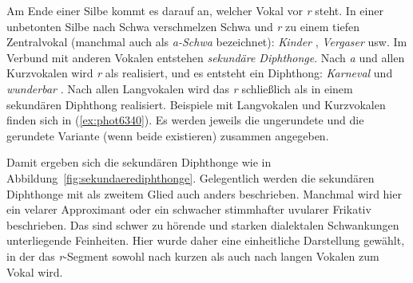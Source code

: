 Am Ende einer Silbe kommt es darauf an, welcher Vokal vor \textit{r} steht.
In einer unbetonten Silbe nach Schwa verschmelzen Schwa und \textit{r} zu einem tiefen Zentralvokal \textipa{[5]} (manchmal auch als \textit{a-Schwa} bezeichnet): \textit{Kinder} \textipa{[kInd5]}, \textit{Vergaser} \textipa{[f5ga:z5]} usw.
Im Verbund mit anderen Vokalen entstehen \textit{sekundäre Diphthonge}.
Nach \textit{a} und allen Kurzvokalen wird \textit{r} als \textipa{[@]} realisiert, und es entsteht ein Diphthong: \textit{Karneval} \textipa{[k\t{a@}n@val]} und \textit{wunderbar} \textipa{[vUnd5b\t{a@}]}.
Nach allen Langvokalen wird das \textit{r} schließlich als \textipa{[5]} in einem sekundären Diphthong realisiert.
Beispiele mit Langvokalen und Kurzvokalen finden sich in (\ref{ex:phot6340}).
Es werden jeweils die ungerundete und die gerundete Variante (wenn beide existieren) zusammen angegeben.

\begin{exe}
  \ex\label{ex:phot6340}
  \begin{xlist}
  \end{xlist}
\end{exe}

Damit ergeben sich die sekundären Diphthonge wie in Abbildung~\ref{fig:sekundaerediphthonge}.
Gelegentlich werden die sekundären Diphthonge mit \textipa{[@]} als zweitem Glied auch anders beschrieben.
Manchmal wird hier ein velarer Approximant \textipa{[\textturnmrleg]} oder ein schwacher stimmhafter uvularer Frikativ \textipa{[\super K]} beschrieben.
Das sind schwer zu hörende und starken dialektalen Schwankungen unterliegende Feinheiten.
Hier wurde daher eine einheitliche Darstellung gewählt, in der das \textit{r}-Segment sowohl nach kurzen als auch nach langen Vokalen zum Vokal wird.

